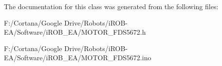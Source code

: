 The documentation for this class was generated from the following files\+:\begin{DoxyCompactItemize}
\item 
F\+:/\+Cortana/\+Google Drive/\+Robots/i\+R\+O\+B-\/\+E\+A/\+Software/i\+R\+O\+B\+\_\+\+E\+A/M\+O\+T\+O\+R\+\_\+\+F\+D\+S5672.\+h\item 
F\+:/\+Cortana/\+Google Drive/\+Robots/i\+R\+O\+B-\/\+E\+A/\+Software/i\+R\+O\+B\+\_\+\+E\+A/M\+O\+T\+O\+R\+\_\+\+F\+D\+S5672.\+ino\end{DoxyCompactItemize}
